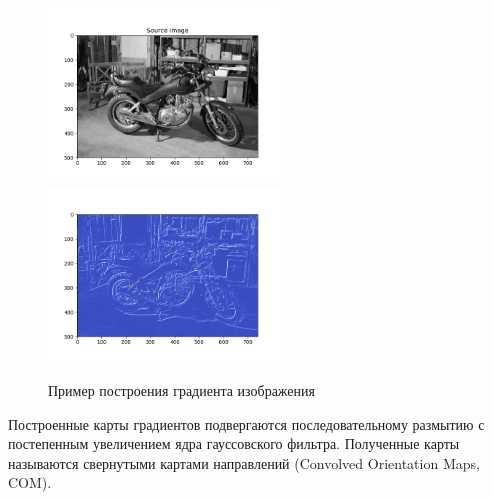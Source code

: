 {{{{{		\begin{figure}[H]
			\centering                             
			\includegraphics[width=0.55\textwidth,keepaspectratio]{daisy/bike_source.png}   
			\includegraphics[width=0.55\textwidth,keepaspectratio]{daisy/bike_gradient.png}       
			\centering\caption{ Пример построения градиента изображения }
			\label{gradient_example}                           
		\end{figure}    
		
		Построенные карты градиентов подвергаются последовательному размытию с постепенным увеличением ядра гауссовского фильтра. Полученные карты называются свернутыми картами направлений (Convolved Orientation Maps, COM).
		
}}}}}
